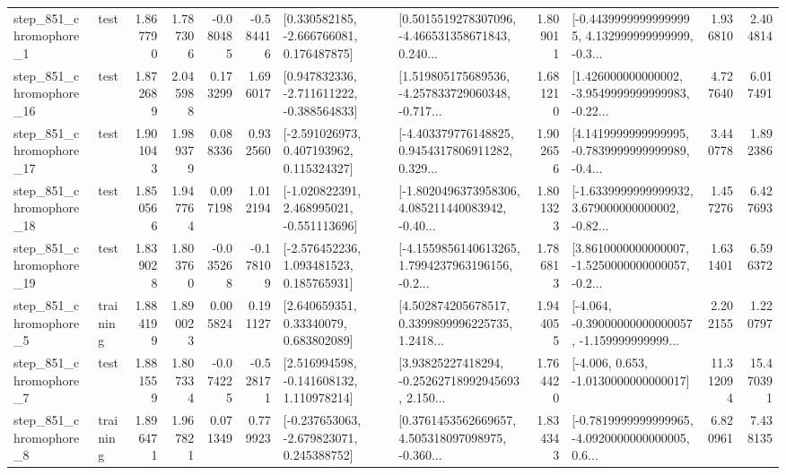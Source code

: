 \begin{tabular}{llrrrrllrlrr}
   step\_851\_chromophore\_1 &      test &      1.867790 &    1.787306 &     -0.080485 & -0.584416 &    [0.330582185, -2.666766081, 0.176487875] &  [0.5015519278307096, -4.466531358671843, 0.240... &       1.809011 &  [-0.44399999999999995, 4.132999999999999, -0.3... &            1.936810 &          2.404814 \\
  step\_851\_chromophore\_16 &      test &      1.872689 &    2.045988 &      0.173299 &  1.696017 &   [0.947832336, -2.711611222, -0.388564833] &  [1.519805175689536, -4.257833729060348, -0.717... &       1.681210 &  [1.426000000000002, -3.9549999999999983, -0.22... &            4.727640 &          6.017491 \\
  step\_851\_chromophore\_17 &      test &      1.901043 &    1.989379 &      0.088336 &  0.932560 &    [-2.591026973, 0.407193962, 0.115324327] &  [-4.403379776148825, 0.9454317806911282, 0.329... &       1.902656 &  [4.1419999999999995, -0.7839999999999989, -0.4... &            3.440778 &          1.892386 \\
  step\_851\_chromophore\_18 &      test &      1.850566 &    1.947764 &      0.097198 &  1.012194 &   [-1.020822391, 2.468995021, -0.551113696] &  [-1.8020496373958306, 4.085211440083942, -0.40... &       1.801323 &  [-1.6339999999999932, 3.679000000000002, -0.82... &            1.457276 &          6.427693 \\
  step\_851\_chromophore\_19 &      test &      1.839028 &    1.803760 &     -0.035268 & -0.178109 &    [-2.576452236, 1.093481523, 0.185765931] &  [-4.1559856140613265, 1.7994237963196156, -0.2... &       1.786813 &  [3.8610000000000007, -1.5250000000000057, -0.2... &            1.631401 &          6.596372 \\
   step\_851\_chromophore\_5 &  training &      1.884199 &    1.890023 &      0.005824 &  0.191127 &      [2.640659351, 0.33340079, 0.683802089] &  [4.502874205678517, 0.3399899996225735, 1.2418... &       1.944055 &  [-4.064, -0.39000000000000057, -1.159999999999... &            2.202155 &          1.220797 \\
   step\_851\_chromophore\_7 &      test &      1.881559 &    1.807334 &     -0.074225 & -0.528171 &    [2.516994598, -0.141608132, 1.110978214] &  [3.93825227418294, -0.25262718992945693, 2.150... &       1.764420 &               [-4.006, 0.653, -1.0130000000000017] &           11.312094 &         15.470391 \\
   step\_851\_chromophore\_8 &  training &      1.896471 &    1.967821 &      0.071349 &  0.779923 &   [-0.237653063, -2.679823071, 0.245388752] &  [0.3761453562669657, 4.505318097098975, -0.360... &       1.834343 &  [-0.7819999999999965, -4.0920000000000005, 0.6... &            6.820961 &          7.438135 \\

\end{tabular}
